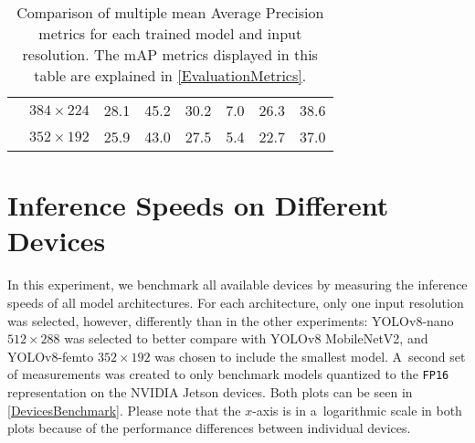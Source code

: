 \begin{table}[t]
\begin{threeparttable}
\begin{tabular}{|c|c|rrrrrr|}
            \cline{2-2}
                                         & \multirow{1}{*}{$384\times224$}  & 28.1 & 45.2 & 30.2 &  7.0 & 26.3 & 38.6 \\
            \cline{2-2}
                                         & \multirow{1}{*}{$352\times192$}  & 25.9 & 43.0 & 27.5 &  5.4 & 22.7 & 37.0 \\
            \hline
        \end{tabular}
        \caption{Comparison of multiple mean Average Precision metrics for each
        trained model and input resolution. The mAP metrics displayed in this table
        are explained in \autoref{EvaluationMetrics}.}
        \label{mAPTableSmall}
    \end{threeparttable}
\end{table}


\section{Inference Speeds on Different Devices}

In this experiment, we benchmark all available devices by measuring the
inference speeds of all model architectures. For each architecture, only one
input resolution was selected, however, differently than in the other
experiments: YOLOv8-nano $512 \times 288$ was selected to better compare with
YOLOv8 MobileNetV2, and YOLOv8-femto $352 \times 192$ was chosen to include the
smallest model. A~second set of measurements was created to only benchmark
models quantized to the \texttt{FP16} representation on the NVIDIA Jetson
devices. Both plots can be seen in \autoref{DevicesBenchmark}. Please note that
the $x$-axis is in a~logarithmic scale in both plots because of the performance
differences between individual devices.

